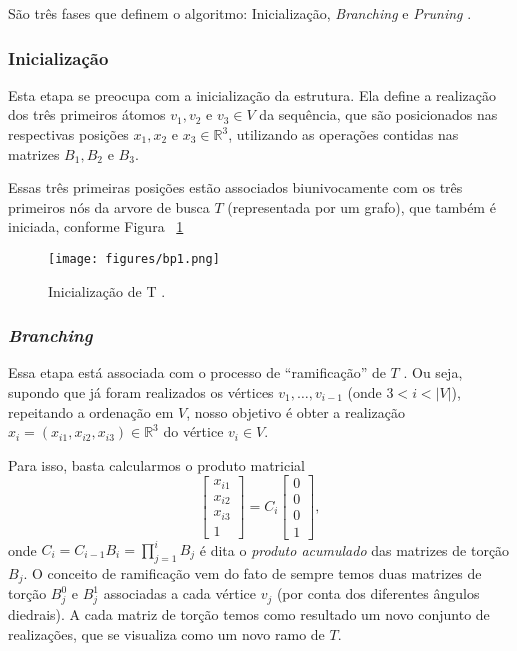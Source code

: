 São três fases que definem o algoritmo: Inicialização, \textit{Branching} e \textit{Pruning} \cite{fidalgotese}.

\subsubsection*{Inicialização}
Esta etapa se preocupa com a inicialização da estrutura. Ela define a realização dos três primeiros átomos $v_1, v_2$ e $v_3 \in V$ da sequência, que são posicionados nas respectivas posições $x_1, x_2$ e $x_3 \in \mathbb{R}^3$, utilizando as operações contidas nas matrizes $B_1, B_2$ e $B_3$. 

Essas três primeiras posições estão associados biunivocamente com os três primeiros nós da arvore de busca $T$ (representada por um grafo), que também é iniciada, conforme Figura ~\ref{fig:bp1}

\begin{figure}[H]
	\begin{center}
		\texttt{[image: figures/bp1.png]}
	\end{center}
	\caption{Inicialização de T \cite{fidalgotese}.}
	\label{fig:bp1}
\end{figure}

\subsubsection*{\textit{Branching}}
Essa etapa está associada com o processo de ``ramificação'' de $T$ \cite{fidalgotese}. Ou seja, supondo que já foram realizados os vértices $v_1, \dots, v_{i-1}$ (onde $3 < i< |V|$), repeitando a ordenação em $V$, nosso objetivo é obter a realização $x_i = (x_{i1}, x_{i2}, x_{i3}) \in \mathbb{R}^3$ do vértice $v_i \in V$.

Para isso, basta calcularmos o produto matricial
$$
\begin{bmatrix}
	x_{i1}\\ 
	x_{i2}\\ 
	x_{i3}\\ 
	1
\end{bmatrix}
= C_{i}\begin{bmatrix}
	0\\ 
	0\\ 
	0\\ 
	1
\end{bmatrix},
$$
onde $C_i = C_{i-1}B_i = \prod_{j=1}^{i}B_j$ é dita o \textit{produto acumulado} das matrizes de torção $B_j$. O conceito de ramificação vem do fato de sempre temos duas matrizes de torção $B_j^0$ e $B_j^1$ associadas a cada vértice $v_j$ (por conta dos diferentes ângulos diedrais). A cada matriz de torção temos como resultado um novo conjunto de realizações, que se visualiza como um novo ramo de $T$.

